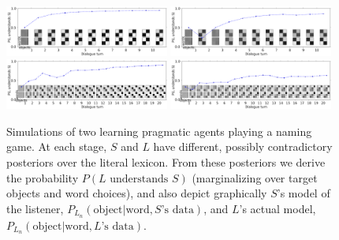 \documentclass{article} %
\newcommand{\word}{\text{word}}
\newcommand{\obj}{\text{object}}
\begin{document}
\begin{figure}[t]
\centering
\includegraphics[width=0.48\textwidth]{figures/emergence2x2-1.pdf}
\includegraphics[width=0.48\textwidth]{figures/emergence2x2-3.pdf} \\
\includegraphics[width=0.48\textwidth]{figures/emergence3x3-0.pdf}
\includegraphics[width=0.48\textwidth]{figures/emergence3x3-1.pdf} \\
\caption{\label{fig:emergence} Simulations of two learning pragmatic agents playing a naming game. At each stage, $S$ and $L$ have different, possibly contradictory posteriors over the literal lexicon. From these posteriors we derive the probability $P(\text{$L$ understands $S$})$ (marginalizing over target objects and word choices), and also depict graphically $S$'s model of the listener, $P_{L_n}(\obj | \word, \text{$S$'s data})$, and $L$'s actual model, $P_{L_n}(\obj | \word, \text{$L$'s data})$.}
\end{figure}
\end{document}
